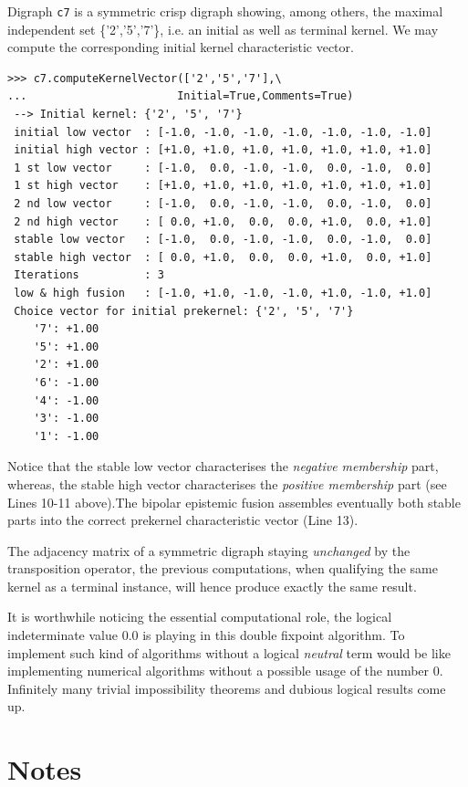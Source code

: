 Digraph \texttt{c7} is a symmetric crisp digraph showing, among others, the maximal independent set \{'2','5','7'\}, i.e. an initial as well as terminal kernel. We may compute the corresponding initial kernel characteristic vector.
\begin{lstlisting}
>>> c7.computeKernelVector(['2','5','7'],\
...                       Initial=True,Comments=True)
 --> Initial kernel: {'2', '5', '7'}
 initial low vector  : [-1.0, -1.0, -1.0, -1.0, -1.0, -1.0, -1.0]
 initial high vector : [+1.0, +1.0, +1.0, +1.0, +1.0, +1.0, +1.0]
 1 st low vector     : [-1.0,  0.0, -1.0, -1.0,  0.0, -1.0,  0.0]
 1 st high vector    : [+1.0, +1.0, +1.0, +1.0, +1.0, +1.0, +1.0]
 2 nd low vector     : [-1.0,  0.0, -1.0, -1.0,  0.0, -1.0,  0.0]
 2 nd high vector    : [ 0.0, +1.0,  0.0,  0.0, +1.0,  0.0, +1.0]
 stable low vector   : [-1.0,  0.0, -1.0, -1.0,  0.0, -1.0,  0.0]
 stable high vector  : [ 0.0, +1.0,  0.0,  0.0, +1.0,  0.0, +1.0]
 Iterations          : 3
 low & high fusion   : [-1.0, +1.0, -1.0, -1.0, +1.0, -1.0, +1.0]
 Choice vector for initial prekernel: {'2', '5', '7'}
    '7': +1.00
    '5': +1.00
    '2': +1.00
    '6': -1.00
    '4': -1.00
    '3': -1.00
    '1': -1.00
\end{lstlisting}
Notice that the stable low vector characterises the \emph{negative membership} part, whereas, the stable high vector characterises the \emph{positive membership} part (see Lines 10-11 above).The bipolar epistemic fusion assembles eventually both stable parts into the correct prekernel characteristic vector (Line 13). 

The adjacency matrix of a symmetric digraph staying \emph{unchanged} by the transposition operator, the previous computations, when qualifying the same kernel as a terminal instance, will hence produce exactly the same result.

It is worthwhile noticing the essential computational role, the logical indeterminate value $0.0$ is playing in this double fixpoint algorithm. To implement such kind of algorithms without a logical \emph{neutral} term would be like implementing numerical algorithms without a possible usage of the number $0$. Infinitely many trivial impossibility theorems and dubious logical results come up. 

{}
\section*{Notes}

